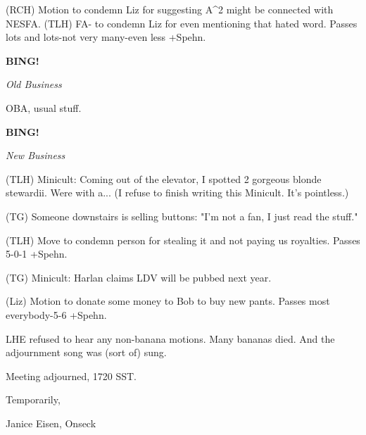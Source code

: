 \documentclass[12pt]{article}
\newcommand{\bing}{{\bf BING!} }
\newcommand{\goto}[1]{\bing \vskip 12pt \centerline{{\em{#1}}}}
\begin{document}
(RCH) Motion to condemn Liz for suggesting A^2 might be connected with NESFA. (TLH) FA- to condemn Liz for even mentioning that hated word. Passes lots and lots-not very many-even less +Spehn.

\goto{Old Business}

OBA, usual stuff.

\goto{New Business}

(TLH) Minicult: Coming out of the elevator, I spotted 2 gorgeous blonde stewardii. Were with a... (I refuse to finish writing this Minicult. It's pointless.)

(TG) Someone downstairs is selling buttons: "I'm not a fan, I just read the stuff."

(TLH) Move to condemn person for stealing it and not paying us royalties. Passes 5-0-1 +Spehn.

(TG) Minicult: Harlan claims LDV will be pubbed next year.

(Liz) Motion to donate some money to Bob to buy new pants. Passes most everybody-5-6 +Spehn.

LHE refused to hear any non-banana motions. Many bananas died. And the adjournment song was (sort of) sung.

\vspace{12pt}

\noindent
Meeting adjourned, 1720 SST.

\vspace{18pt}

\centerline{Temporarily,}
\centerline{Janice Eisen, Onseck}
\end{document}

